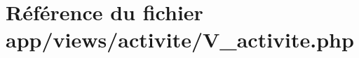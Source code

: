\hypertarget{_v__activite_8php}{}\section{Référence du fichier app/views/activite/\+V\+\_\+activite.php}
\label{_v__activite_8php}
